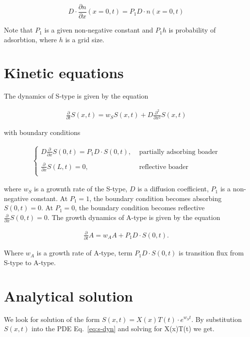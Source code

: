 \documentclass[10pt, oneside]{article}
\begin{document}
\begin{equation}
D\cdot \frac{\partial n}{ \partial x}(x=0,t)=
P_1D  \cdot n(x=0,t)
\end{equation}

Note that $P_1$ is a given non-negative constant and  $P_1h$ is probability of adsorbtion, where $h$ is a grid size.


\section{Kinetic equations}

The dynamics of S-type is given by the equation
%
\begin{linenomath}
	\begin{align} 
	\label{eq:s-dyn}
	\frac{\partial}{\partial t} S(x,t)= w_SS(x,t) + D \frac{\partial^2}{\partial x^2} S(x,t)
	\end{align}
\end{linenomath}
%
with boundary conditions
%
\begin{linenomath}
	\begin{align} 
	\label{eq:s-boundary}
	\begin{cases}
	D \frac{\partial}{\partial x} S(0,t) = P_1D \cdot S(0,t),  &\text{ partially adsorbing boader}\\\\ 
	\frac{\partial}{\partial x} S(L,t) = 0, &\text{ reflective boader}\\
	\end{cases}
	\end{align}
\end{linenomath}
%
where $w_S$ is a grownth rate of the S-type, $D$ is a diffusion coefficient, $P_1$ is a non-negative constant.
At $P_1 = 1$,  the boundary condition becomes absorbing $S(0,t) = 0$.
At $P_1 = 0$, the boundary condition becomes reflective $\frac{\partial}{\partial x} S(0,t) = 0$.
\newline
\newline
The growth dynamics of A-type is given by the equation
%
\begin{linenomath}
	\begin{align} 
	\label{eq:a-dyn}
	\frac{\partial}{\partial t} A = w_A A + P_1D \cdot S(0,t).
	\end{align}
\end{linenomath}
%
Where $w_A$ is a growth rate of A-type, term $P_1D \cdot S(0,t)$ is transition flux from S-type to A-type.

\section{Analytical solution}
We look for solution of the form $S(x,t)=X(x)T(t)\cdot e^{w_St}$. By substitution $S(x,t)$ into the PDE Eq.~\eqref{eq:s-dyn} and solving for X(x)T(t) we get.
\end{document}
